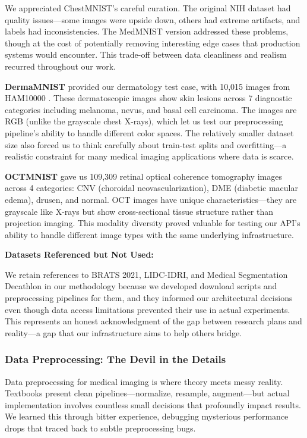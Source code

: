 \documentclass[12pt,a4paper]{article}
\begin{document}
We appreciated ChestMNIST's careful curation. The original NIH dataset had quality issues—some images were upside down, others had extreme artifacts, and labels had inconsistencies. The MedMNIST version addressed these problems, though at the cost of potentially removing interesting edge cases that production systems would encounter. This trade-off between data cleanliness and realism recurred throughout our work.

\textbf{DermaMNIST} provided our dermatology test case, with 10,015 images from HAM10000 \cite{tschandl2018ham10000}. These dermatoscopic images show skin lesions across 7 diagnostic categories including melanoma, nevus, and basal cell carcinoma. The images are RGB (unlike the grayscale chest X-rays), which let us test our preprocessing pipeline's ability to handle different color spaces. The relatively smaller dataset size also forced us to think carefully about train-test splits and overfitting—a realistic constraint for many medical imaging applications where data is scarce.

\textbf{OCTMNIST} gave us 109,309 retinal optical coherence tomography images \cite{kermany2018identifying} across 4 categories: CNV (choroidal neovascularization), DME (diabetic macular edema), drusen, and normal. OCT images have unique characteristics—they are grayscale like X-rays but show cross-sectional tissue structure rather than projection imaging. This modality diversity proved valuable for testing our API's ability to handle different image types with the same underlying infrastructure.

\textbf{Datasets Referenced but Not Used:}

We retain references to BRATS 2021, LIDC-IDRI, and Medical Segmentation Decathlon in our methodology because we developed download scripts and preprocessing pipelines for them, and they informed our architectural decisions even though data access limitations prevented their use in actual experiments. This represents an honest acknowledgment of the gap between research plans and reality—a gap that our infrastructure aims to help others bridge.

\subsubsection{Data Preprocessing: The Devil in the Details}

Data preprocessing for medical imaging is where theory meets messy reality. Textbooks present clean pipelines—normalize, resample, augment—but actual implementation involves countless small decisions that profoundly impact results. We learned this through bitter experience, debugging mysterious performance drops that traced back to subtle preprocessing bugs.
\end{document}
